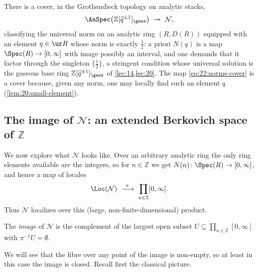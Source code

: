 \begin{remark}
\label{rmk:22:gaseous-cover}
There is a cover, in the Grothendieck topology on analytic stacks,
\begin{equation}
\label{eq:22:norms-cover}
\AnSpec\bigl(\mathbb Z[\widehat q^{\pm1}]_\gasx\bigr)\ \twoheadrightarrow\
\mathcal N ,
\end{equation}
classifying the universal norm on an analytic ring $(R,D(R))$ equipped with an
element $q\in\ur R$ whose norm is exactly $\tfrac12$: a priori $N(q)$ is a map
$\Spec(R)\to[0,\infty]$ with image possibly an interval, and one demands that it
factor through the singleton $\{\tfrac12\}$, a stringent condition whose
universal solution is the gaseous base ring $\mathbb Z[\widehat q^{\pm1}]_\gasx$
of \cref{lec:14,lec:20}. The map \eqref{eq:22:norms-cover} is a cover because,
given any norm, one may locally find such an element $q$
(\cref{lem:20:small-element}).
\end{remark}

\subsection{The image of \texorpdfstring{$\mathcal N$}{N}: an extended
Berkovich space of \texorpdfstring{$\mathbb Z$}{Z}}
\label{subsec:22:image}

We now explore what $\mathcal N$ looks like. Over an arbitrary analytic ring the
only ring elements available are the integers, so for $n\in\mathbb Z$ we get
$N(n)\colon\Spec(R)\to[0,\infty]$, and hence a map of locales
\begin{equation*}
\Loc(\mathcal N)\ \xrightarrow{\ \pi\ }\ \prod_{n\in\mathbb Z}[0,\infty] .
\end{equation*}
Thus $\mathcal N$ localizes over this (large, non-finite-dimensional) product.

\begin{definition}[Image]
\label{def:22:image}
The \emph{image} of $\mathcal N$ is the complement of the largest open subset
$U\subseteq\prod_{n\in\mathbb Z}[0,\infty]$ with $\pi^{-1}U=\emptyset$.
\end{definition}

We will see that the fibre over any point of the image is non-empty, so at least
in this case the image is closed. Recall first the classical picture.

